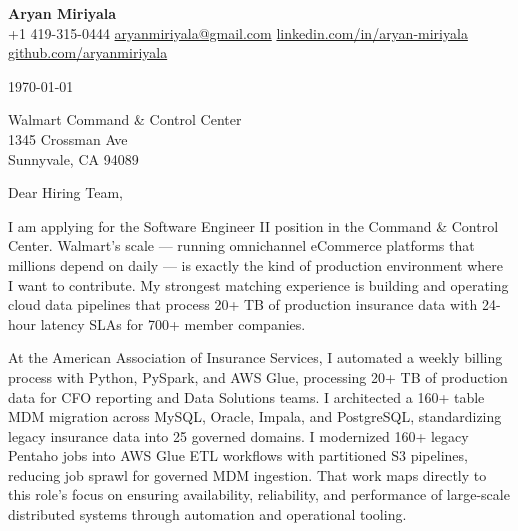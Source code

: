 \documentclass[letterpaper,11pt]{article}
\begin{document}
\begin{center}
  {\LARGE \textbf{Aryan Miriyala}}\\[4pt]
  \small
  +1 419-315-0444 \textbar{} \href{mailto:aryanmiriyala@gmail.com}{aryanmiriyala@gmail.com} \textbar{} \href{https://www.linkedin.com/in/aryan-miriyala-7788a21b6/}{linkedin.com/in/aryan-miriyala}\\
  \href{https://github.com/aryanmiriyala}{github.com/aryanmiriyala}
\end{center}

\vspace{12pt}

\today

\vspace{12pt}

Walmart Command \& Control Center\\
1345 Crossman Ave\\
Sunnyvale, CA 94089

\vspace{12pt}

Dear Hiring Team,

\vspace{6pt}

I am applying for the Software Engineer II position in the Command \& Control Center. Walmart's scale — running omnichannel eCommerce platforms that millions depend on daily — is exactly the kind of production environment where I want to contribute. My strongest matching experience is building and operating cloud data pipelines that process 20+ TB of production insurance data with 24-hour latency SLAs for 700+ member companies.

\vspace{6pt}

At the American Association of Insurance Services, I automated a weekly billing process with Python, PySpark, and AWS Glue, processing 20+ TB of production data for CFO reporting and Data Solutions teams. I architected a 160+ table MDM migration across MySQL, Oracle, Impala, and PostgreSQL, standardizing legacy insurance data into 25 governed domains. I modernized 160+ legacy Pentaho jobs into AWS Glue ETL workflows with partitioned S3 pipelines, reducing job sprawl for governed MDM ingestion. That work maps directly to this role's focus on ensuring availability, reliability, and performance of large-scale distributed systems through automation and operational tooling.

\vspace{6pt}
\end{document}
